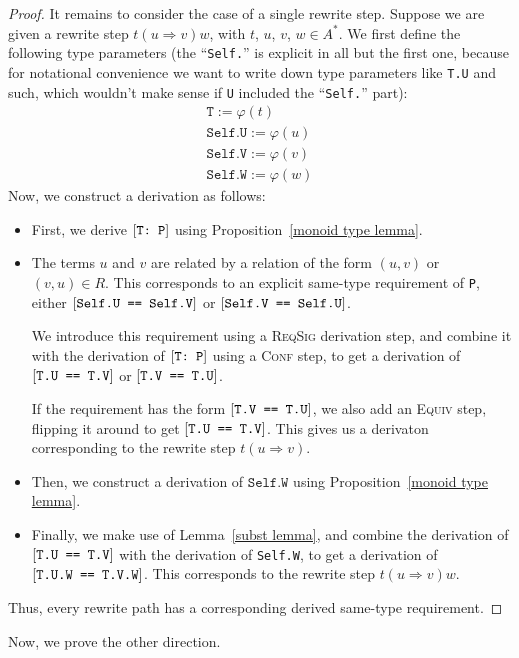 \documentclass[../generics]{subfiles}
\begin{document}
\begin{proof}
It remains to consider the case of a single rewrite step. Suppose we are given a rewrite step $t(u\Rightarrow v)w$, with $t$, $u$, $v$, $w\in A^*$. We first define the following type parameters (the ``\texttt{Self.}'' is explicit in all but the first one, because for notational convenience we want to write down type parameters like \texttt{T.U} and such, which wouldn't make sense if \texttt{U} included the ``\texttt{Self.}'' part):
\begin{gather*}
\texttt{T} := \varphi(t)\\
\texttt{Self.U} := \varphi(u)\\
\texttt{Self.V} := \varphi(v)\\
\texttt{Self.W} := \varphi(w)
\end{gather*}
Now, we construct a derivation as follows:
\begin{itemize}
\item First, we derive $[\texttt{T:~P}]$ using Proposition~\ref{monoid type lemma}.
\item The terms $u$ and $v$ are related by a relation of the form $(u,v)$ or $(v,u)\in R$. This corresponds to an explicit same-type requirement of \texttt{P}, either $[\texttt{Self.U == Self.V}]$ or $[\texttt{Self.V == Self.U}]$.

We introduce this requirement using a \textsc{ReqSig} derivation step, and combine it with the derivation of $[\texttt{T:~P}]$ using a \textsc{Conf} step, to get a derivation of $[\texttt{T.U == T.V}]$ or $[\texttt{T.V == T.U}]$.

If the requirement has the form $[\texttt{T.V == T.U}]$, we also add an \textsc{Equiv} step, flipping it around to get $[\texttt{T.U == T.V}]$. This gives us a derivaton corresponding to the rewrite step $t(u\Rightarrow v)$.

\item Then, we construct a derivation of $\texttt{Self.W}$  using Proposition~\ref{monoid type lemma}.
\item Finally, we make use of Lemma~\ref{subst lemma}, and combine the derivation of $[\texttt{T.U == T.V}]$ with the derivation of \texttt{Self.W}, to get a derivation of $[\texttt{T.U.W == T.V.W}]$. This corresponds to the rewrite step $t(u\Rightarrow v)w$.
\end{itemize}
Thus, every rewrite path has a corresponding derived same-type requirement.
\end{proof}

Now, we prove the other direction.
\end{document}
